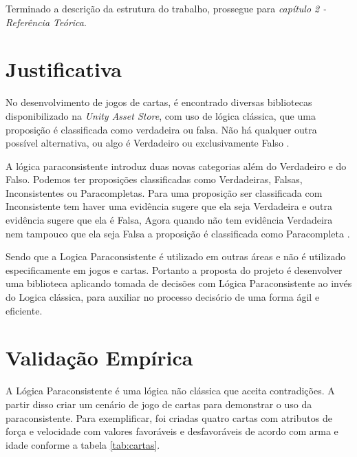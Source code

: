 Terminado a descrição da estrutura do trabalho, prossegue para \textit{capítulo 2 - Referência Teórica}.

\section{Justificativa}

No desenvolvimento de jogos de cartas, é encontrado diversas bibliotecas disponibilizado na \textit{Unity Asset Store}, com uso de lógica clássica, que uma proposição é classificada como verdadeira ou falsa. Não há qualquer outra possível alternativa, ou algo é Verdadeiro ou exclusivamente Falso \cite{aspectos-lpa-2013}.

A lógica paraconsistente introduz duas novas categorias além do Verdadeiro e do Falso. Podemos ter proposições classificadas como Verdadeiras, Falsas, Inconsistentes ou Paracompletas. Para uma proposição ser classificada com Inconsistente tem haver uma evidência sugere que ela seja Verdadeira e outra evidência sugere que ela é Falsa, Agora quando não tem evidência Verdadeira nem tampouco que ela seja Falsa a proposição é classificada como Paracompleta \cite{aspectos-lpa-2013}.

Sendo que a Logica Paraconsistente é utilizado em outras áreas e não é utilizado especificamente em jogos e cartas. Portanto a proposta do projeto é desenvolver uma biblioteca aplicando tomada de decisões com Lógica Paraconsistente ao invés do Logica clássica, para auxiliar no processo decisório de uma forma ágil e eficiente.


\section{Validação Empírica}

A Lógica Paraconsistente é uma lógica não clássica que aceita contradições. A partir disso criar um cenário de jogo de cartas para demonstrar o uso da
paraconsistente. Para exemplificar, foi criadas quatro cartas com atributos de força e velocidade com valores favoráveis e desfavoráveis de acordo com arma e idade conforme a tabela \ref{tab:cartas}.

